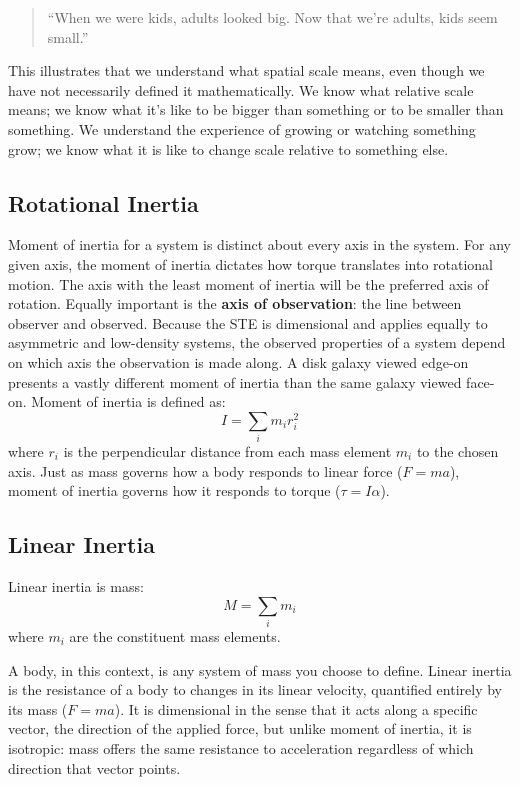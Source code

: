 \documentclass[a4paper,11pt]{article}
\begin{document}
\begin{quote}
``When we were kids, adults looked big. Now that we're adults, kids seem small.''
\end{quote}

This illustrates that we understand what spatial scale means, even though we have not necessarily defined it mathematically. We know what relative scale means; we know what it's like to be bigger than something or to be smaller than something. We understand the experience of growing or watching something grow; we know what it is like to change scale relative to something else.

\subsection{Rotational Inertia}
Moment of inertia for a system is distinct about every axis in the system. For any given axis, the moment of inertia dictates how torque translates into rotational motion. The axis with the least moment of inertia will be the preferred axis of rotation. Equally important is the \textbf{axis of observation}: the line between observer and observed. Because the STE is dimensional and applies equally to asymmetric and low-density systems, the observed properties of a system depend on which axis the observation is made along. A disk galaxy viewed edge-on presents a vastly different moment of inertia than the same galaxy viewed face-on. Moment of inertia is defined as:
\begin{equation}
I = \sum_i m_i r_i^2
\end{equation}
where $r_i$ is the perpendicular distance from each mass element $m_i$ to the chosen axis. Just as mass governs how a body responds to linear force ($F = ma$), moment of inertia governs how it responds to torque ($\tau = I\alpha$).

\subsection{Linear Inertia}
Linear inertia is mass:
\begin{equation}
M = \sum_i m_i
\end{equation}
where $m_i$ are the constituent mass elements.

A body, in this context, is any system of mass you choose to define. Linear inertia is the resistance of a body to changes in its linear velocity, quantified entirely by its mass ($F = ma$). It is dimensional in the sense that it acts along a specific vector, the direction of the applied force, but unlike moment of inertia, it is isotropic: mass offers the same resistance to acceleration regardless of which direction that vector points.
\end{document}
